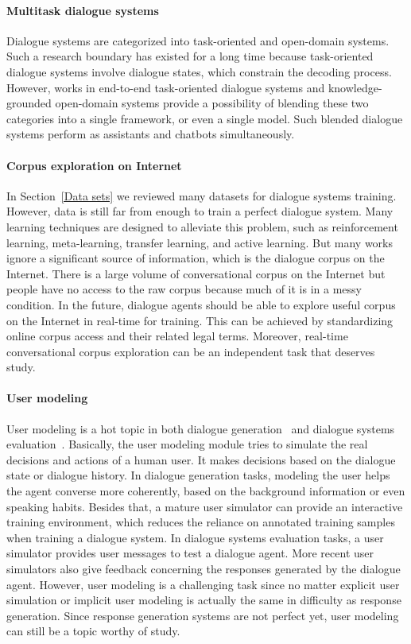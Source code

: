 \paragraph*{Multitask dialogue systems} Dialogue systems are categorized into task-oriented and open-domain systems. Such a research boundary has existed for a long time because task-oriented dialogue systems involve dialogue states, which constrain the decoding process. However, works in end-to-end task-oriented dialogue systems and knowledge-grounded open-domain systems provide a possibility of blending these two categories into a single framework, or even a single model. Such blended dialogue systems perform as assistants and chatbots simultaneously. 
\paragraph*{Corpus exploration on Internet} In Section~\ref{Data sets} we reviewed many datasets for dialogue systems training. However, data is still far from enough to train a perfect dialogue system. Many learning techniques are designed to alleviate this problem, such as reinforcement learning, meta-learning, transfer learning, and active learning. But many works ignore a significant source of information, which is the dialogue corpus on the Internet. There is a large volume of conversational corpus on the Internet but people have no access to the raw corpus because much of it is in a messy condition. In the future, dialogue agents should be able to explore useful corpus on the Internet in real-time for training. This can be achieved by standardizing online corpus access and their related legal terms. Moreover, real-time conversational corpus exploration can be an independent task that deserves study.
\paragraph*{User modeling} User modeling is a hot topic in both dialogue generation~ and dialogue systems evaluation~. Basically, the user modeling module tries to simulate the real decisions and actions of a human user. It makes decisions based on the dialogue state or dialogue history. In dialogue generation tasks, modeling the user helps the agent converse more coherently, based on the background information or even speaking habits. Besides that, a mature user simulator can provide an interactive training environment, which reduces the reliance on annotated training samples when training a dialogue system. In dialogue systems evaluation tasks, a user simulator provides user messages to test a dialogue agent. More recent user simulators also give feedback concerning the responses generated by the dialogue agent. However, user modeling is a challenging task since no matter explicit user simulation or implicit user modeling is actually the same in difficulty as response generation. Since response generation systems are not perfect yet, user modeling can still be a topic worthy of study.
